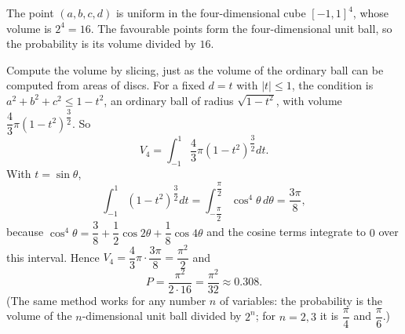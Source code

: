 The point $(a,b,c,d)$ is uniform in the four-dimensional cube $[-1,1]^4$, whose volume is $2^4=16$. The favourable points form the four-dimensional unit ball, so the probability is its volume divided by $16$.

Compute the volume by slicing, just as the volume of the ordinary ball can be computed from areas of discs. For a fixed $d=t$ with $|t|\le1$, the condition is $a^2+b^2+c^2\le1-t^2$, an ordinary ball of radius $\sqrt{1-t^2}$, with volume $\dfrac{4}{3}\pi\left(1-t^2\right)^{\dfrac{3}{2}}$. So
\[
V_4=\int_{-1}^{1}\dfrac{4}{3}\pi\left(1-t^2\right)^{\dfrac{3}{2}}dt .
\]
With $t=\sin\theta$,
\[
\int_{-1}^{1}\left(1-t^2\right)^{\dfrac{3}{2}}dt=\int_{-\dfrac{\pi}{2}}^{\dfrac{\pi}{2}}\cos^4\theta\,d\theta=\dfrac{3\pi}{8},
\]
because $\cos^4\theta=\dfrac{3}{8}+\dfrac{1}{2}\cos2\theta+\dfrac{1}{8}\cos4\theta$ and the cosine terms integrate to $0$ over this interval. Hence $V_4=\dfrac{4}{3}\pi\cdot\dfrac{3\pi}{8}=\dfrac{\pi^2}{2}$ and
\[
P=\dfrac{\pi^2}{2\cdot16}=\boxed{\dfrac{\pi^2}{32}}\approx0.308 .
\]
(The same method works for any number $n$ of variables: the probability is the volume of the $n$-dimensional unit ball divided by $2^n$; for $n=2,3$ it is $\dfrac{\pi}{4}$ and $\dfrac{\pi}{6}$.)
